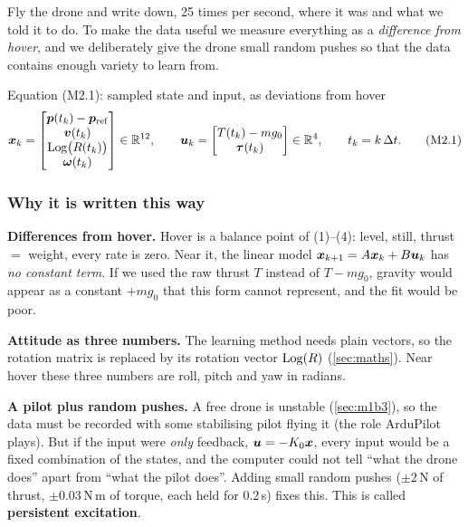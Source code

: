 \begin{idea}
Fly the drone and write down, 25 times per second, where it was and what we told it to do. To make the data useful we
measure everything as a \emph{difference from hover}, and we deliberately give the drone small random pushes so that the
data contains enough variety to learn from.
\end{idea}

\begin{eqbox}{Equation (M2.1): sampled state and input, as deviations from hover}
\begin{equation}
  \bm{x}_k=\begin{bmatrix}\bm{p}(t_k)-\bm{p}_{\mathrm{ref}}\\ \bm{v}(t_k)\\ \mathrm{Log}\big(R(t_k)\big)\\ \bm{\omega}(t_k)\end{bmatrix}\in\mathbb{R}^{12},\qquad
  \bm{u}_k=\begin{bmatrix}T(t_k)-mg_0\\ \bm{\tau}(t_k)\end{bmatrix}\in\mathbb{R}^{4},\qquad t_k=k\,\Delta t . \tag{M2.1}
\end{equation}
\end{eqbox}

\subsubsection*{Why it is written this way}
\textbf{Differences from hover.} Hover is a balance point of (1)--(4): level, still, thrust $=$ weight, every rate is
zero. Near it, the linear model $\bm{x}_{k+1}=A\bm{x}_k+B\bm{u}_k$ has \emph{no constant term}. If we used the raw thrust $T$
instead of $T-mg_0$, gravity would appear as a constant $+mg_0$ that this form cannot represent, and the fit would be poor.

\textbf{Attitude as three numbers.} The learning method needs plain vectors, so the rotation matrix is replaced by its
rotation vector $\mathrm{Log}(R)$ (\cref{sec:maths}). Near hover these three numbers are roll, pitch and yaw in radians.

\textbf{A pilot plus random pushes.} A free drone is unstable (\cref{sec:m1b3}), so the data must be recorded with some
stabilising pilot flying it (the role ArduPilot plays). But if the input were \emph{only} feedback, $\bm{u}=-K_0\bm{x}$, every
input would be a fixed combination of the states, and the computer could not tell ``what the drone does'' apart from
``what the pilot does''. Adding small random pushes ($\pm2$\,N of thrust, $\pm0.03$\,N\,m of torque, each held for 0.2\,s) fixes
this. This is called \textbf{persistent excitation}.

